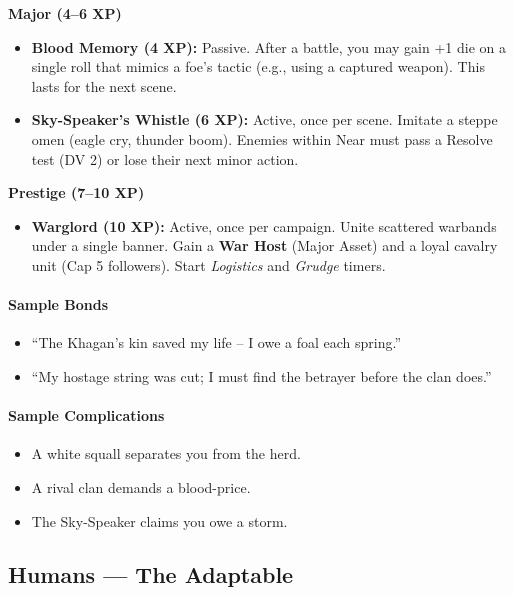 \textbf{Major (4--6 XP)}
\begin{itemize}
  \item \textbf{Blood Memory (4 XP):} Passive. After a battle, you may gain +1 die on a single roll that mimics a foe's tactic (e.g., using a captured weapon). This lasts for the next scene.
  \item \textbf{Sky-Speaker's Whistle (6 XP):} Active, once per scene. Imitate a steppe omen (eagle cry, thunder boom). Enemies within Near must pass a Resolve test (DV 2) or lose their next minor action.
\end{itemize}

\textbf{Prestige (7--10 XP)}
\begin{itemize}
  \item \textbf{Warglord (10 XP):} Active, once per campaign. Unite scattered warbands under a single banner. Gain a \textbf{War Host} (Major Asset) and a loyal cavalry unit (Cap 5 followers). Start \emph{Logistics} and \emph{Grudge} timers.
\end{itemize}

\paragraph{Sample Bonds}
\begin{itemize}
  \item ``The Khagan's kin saved my life -- I owe a foal each spring.''
  \item ``My hostage string was cut; I must find the betrayer before the clan does.''
\end{itemize}

\paragraph{Sample Complications}
\begin{itemize}
  \item A white squall separates you from the herd.
  \item A rival clan demands a blood-price.
  \item The Sky-Speaker claims you owe a storm.
\end{itemize}

\clearpage

\subsection{Humans --- The Adaptable}
\label{sec:humans-detailed}

